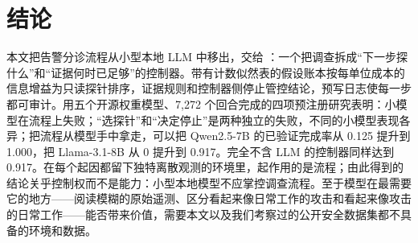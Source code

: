 \section{结论}
\label{sec:conclusion}

本文把告警分诊流程从小型本地 LLM 中移出，交给 \hesp{}：一个把调查拆成“下一步探什么”和“证据何时已足够”的控制器。带有计数似然表的假设账本按每单位成本的信息增益为只读探针排序，证据规则和控制器侧停止管控结论，预写日志使每一步都可审计。用五个开源权重模型、7{,}272 个回合完成的四项预注册研究表明：小模型在流程上失败；“选探针”和“决定停止”是两种独立的失败，不同的小模型表现各异；把流程从模型手中拿走，可以把 Qwen2.5-7B 的已验证完成率从 0.125 提升到 1.000，把 Llama-3.1-8B 从 0 提升到 0.917。完全不含 LLM 的控制器同样达到 0.917。在每个起因都留下独特离散观测的环境里，起作用的是流程；由此得到的结论关乎控制权而不是能力：小型本地模型不应掌控调查流程。至于模型在最需要它的地方——阅读模糊的原始遥测、区分看起来像日常工作的攻击和看起来像攻击的日常工作——能否带来价值，需要本文以及我们考察过的公开安全数据集都不具备的环境和数据。
